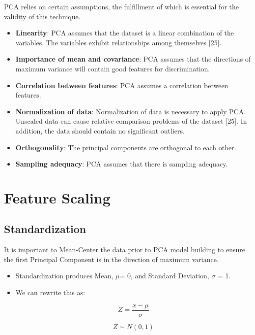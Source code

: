 \documentclass[
  letterpaper,
  DIV=11,
  numbers=noendperiod]{scrreprt}
\begin{document}
PCA relies on certain assumptions, the fulfillment of which is essential
for the validity of this technique.

\begin{itemize}
\item
  \textbf{Linearity}: PCA assumes that the dataset is a linear
  combination of the variables. The variables exhibit relationships
  among themselves {[}25{]}.
\item
  \textbf{Importance of mean and covariance}: PCA assumes that the
  directions of maximum variance will contain good features for
  discrimination.
\item
  \textbf{Correlation between features}: PCA assumes a correlation
  between features.
\item
  \textbf{Normalization of data}: Normalization of data is necessary to
  apply PCA. Unscaled data can cause relative comparison problems of the
  dataset {[}25{]}. In addition, the data should contain no significant
  outliers.
\item
  \textbf{Orthogonality}: The principal components are orthogonal to
  each other.
\item
  \textbf{Sampling adequacy}: PCA assumes that there is sampling
  adequacy.
\end{itemize}

\hypertarget{feature-scaling-1}{%
\section{Feature Scaling}\label{feature-scaling-1}}

\hypertarget{standardization}{%
\subsection{Standardization}\label{standardization}}

It is important to Mean-Center the data prior to PCA model building to
ensure the first Principal Component is in the direction of maximum
variance.

\begin{itemize}
\item
  Standardization produces Mean, \(\mu\)= 0, and Standard Deviation,
  \(\sigma\) = 1.
\item
  We can rewrite this as:

  \[
  Z = \frac{{x - \mu}}{{\sigma}}
  \]

  \[
  Z \sim N(0,1)
  \]
\end{itemize}
\end{document}
